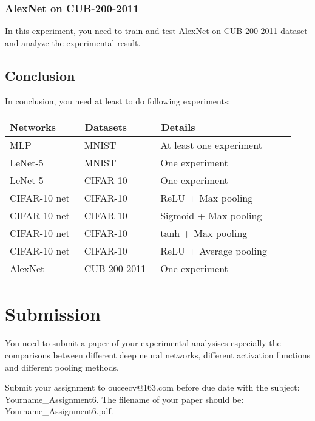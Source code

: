 \documentclass[a4paper,11pt]{article}
\begin{document}
\subsubsection{AlexNet on CUB-200-2011}
In this experiment, you need to train and test AlexNet on CUB-200-2011 dataset and analyze the experimental result.
\subsection{Conclusion}
In conclusion, you need at least to do following experiments:
\begin{table}[!ht]
  \centering
  \begin{tabular}{lllll}
    \toprule
    \cmidrule{1-3}
     Networks       &\ Datasets &\ Details  \\
    \midrule
     MLP  & \ MNIST & \ At least one experiment \\ [3pt]\hline
     LeNet-5  & \ MNIST & \ One experiment \\ [3pt]\hline
     LeNet-5  & \ CIFAR-10 & \ One experiment \\ [3pt]\hline
     CIFAR-10 net  & \ CIFAR-10 & \ ReLU + Max pooling \\ [3pt]\hline
     CIFAR-10 net  & \ CIFAR-10 & \ Sigmoid + Max pooling \\ [3pt]\hline
     CIFAR-10 net  & \ CIFAR-10 & \ tanh + Max pooling \\ [3pt]\hline
     CIFAR-10 net  & \ CIFAR-10 & \ ReLU + Average pooling \\ [3pt]\hline
     AlexNet  & \ CUB-200-2011 & \ One experiment \\ [3pt]
    \bottomrule
  \end{tabular}
\end{table}
\section{Submission}
You need to submit a paper of your experimental analysises especially the comparisons between different deep neural networks, different activation functions and different pooling methods. 

Submit your assignment to ouceecv@163.com before due date with the subject: Yourname\_Assignment6. The filename of your paper should be: Yourname\_Assignment6.pdf. 
\end{document}
